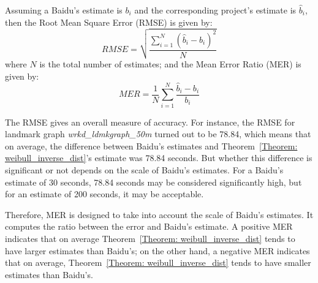 \begin{table}[h!]
\centering
{}
\caption{A summary of evaluation results}\label{Ta:eval_res}
\end{table}

Assuming a Baidu's estimate is $b_{i}$ and the corresponding project's estimate is $\hat{b}_{i}$, then the Root Mean Square Error (RMSE) is given by:
\begin{equation}
RMSE = \sqrt{\frac{\sum_{i = 1}^{N}(\hat{b}_{i} - b_{i})^{2}}{N}}
\end{equation}
where $N$ is the total number of estimates; and the Mean Error Ratio (MER) is given by:
\begin{equation}
MER = \frac{1}{N}\sum_{i = 1}^{N}\frac{\hat{b}_{i} - b_{i}}{b_{i}}
\end{equation}

The RMSE gives an overall measure of accuracy. For instance, the RMSE for landmark graph \emph{wrkd\_ldmkgraph\_50m} turned out to be 78.84, which means that on average, the difference between Baidu's estimates and Theorem~\ref{Theorem: weibull_inverse_dist}'s estimate was 78.84 seconds. But whether this difference is significant or not depends on the scale of Baidu's estimates. For a Baidu's estimate of 30 seconds, 78.84 seconds may be considered significantly high, but for an estimate of 200 seconds, it may be acceptable. 

Therefore, MER is designed to take into account the scale of Baidu's estimates. It computes the ratio between the error and Baidu's estimate. A positive MER indicates that on average Theorem~\ref{Theorem: weibull_inverse_dist} tends to have larger estimates than Baidu's; on the other hand, a negative MER indicates that on average, Theorem~\ref{Theorem: weibull_inverse_dist} tends to have smaller estimates than Baidu's. 

